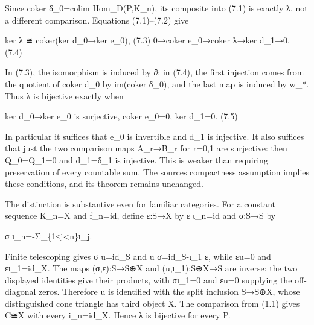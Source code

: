 \documentclass[11pt]{article}
\begin{document}
Since coker δ\_\allowbreak{}0\allowbreak{}=colim Hom\_\allowbreak{}D(P,\allowbreak{}K\_\allowbreak{}n)\allowbreak{},\allowbreak{} its composite into (7.1)\allowbreak{} is exactly λ,\allowbreak{} not a different comparison. Equations (7.1)\allowbreak{}–\allowbreak{}(7.2)\allowbreak{} give

ker λ ≅ coker(ker d\_\allowbreak{}0\allowbreak{}→ker e\_\allowbreak{}0)\allowbreak{},\allowbreak{} (7.3)\allowbreak{} 0\allowbreak{}→coker e\_\allowbreak{}0\allowbreak{}→coker λ\allowbreak{}→ker d\_\allowbreak{}1\allowbreak{}→0. (7.4)\allowbreak{}

In (7.3)\allowbreak{},\allowbreak{} the isomorphism is induced by ∂; in (7.4)\allowbreak{},\allowbreak{} the first injection comes from the quotient of coker d\_\allowbreak{}0 by im(coker δ\_\allowbreak{}0)\allowbreak{},\allowbreak{} and the last map is induced by w\_\allowbreak{}*. Thus λ is bijective exactly when

ker d\_\allowbreak{}0\allowbreak{}→ker e\_\allowbreak{}0 is surjective,\allowbreak{} coker e\_\allowbreak{}0\allowbreak{}=0,\allowbreak{} ker d\_\allowbreak{}1\allowbreak{}=0. (7.5)\allowbreak{}

In particular it suffices that e\_\allowbreak{}0 is invertible and d\_\allowbreak{}1 is injective. It also suffices that just the two comparison maps A\_\allowbreak{}r\allowbreak{}→B\_\allowbreak{}r for r\allowbreak{}=0,\allowbreak{}1 are surjective:\allowbreak{} then Q\_\allowbreak{}0\allowbreak{}=Q\_\allowbreak{}1\allowbreak{}=0 and d\_\allowbreak{}1\allowbreak{}=δ\_\allowbreak{}1 is injective. This is weaker than requiring preservation of every countable sum. The source\textquotesingle s compactness assumption implies these conditions,\allowbreak{} and its theorem remains unchanged.

The distinction is substantive even for familiar categories. For a constant sequence K\_\allowbreak{}n\allowbreak{}=X and f\_\allowbreak{}n\allowbreak{}=id,\allowbreak{} define ε:\allowbreak{}S\allowbreak{}→X by ε ι\_\allowbreak{}n\allowbreak{}=id and σ:\allowbreak{}S\allowbreak{}→S by

σ ι\_\allowbreak{}n\allowbreak{}=-Σ\_\allowbreak{}\{1≤j<n\}ι\_\allowbreak{}j.

Finite telescoping gives σ u\allowbreak{}=id\_\allowbreak{}S and u σ\allowbreak{}=id\_\allowbreak{}S-ι\_\allowbreak{}1 ε,\allowbreak{} while εu\allowbreak{}=0 and ει\_\allowbreak{}1\allowbreak{}=id\_\allowbreak{}X. The maps (σ,\allowbreak{}ε)\allowbreak{}:\allowbreak{}S\allowbreak{}→S\allowbreak{}⊕X and (u,\allowbreak{}ι\_\allowbreak{}1)\allowbreak{}:\allowbreak{}S\allowbreak{}⊕X\allowbreak{}→S are inverse:\allowbreak{} the two displayed identities give their products,\allowbreak{} with σι\_\allowbreak{}1\allowbreak{}=0 and εu\allowbreak{}=0 supplying the off-diagonal zeros. Therefore u is identified with the split inclusion S\allowbreak{}→S\allowbreak{}⊕X,\allowbreak{} whose distinguished cone triangle has third object X. The comparison from (1.1)\allowbreak{} gives C≅X with every i\_\allowbreak{}n\allowbreak{}=id\_\allowbreak{}X. Hence λ is bijective for every P.
\end{document}
